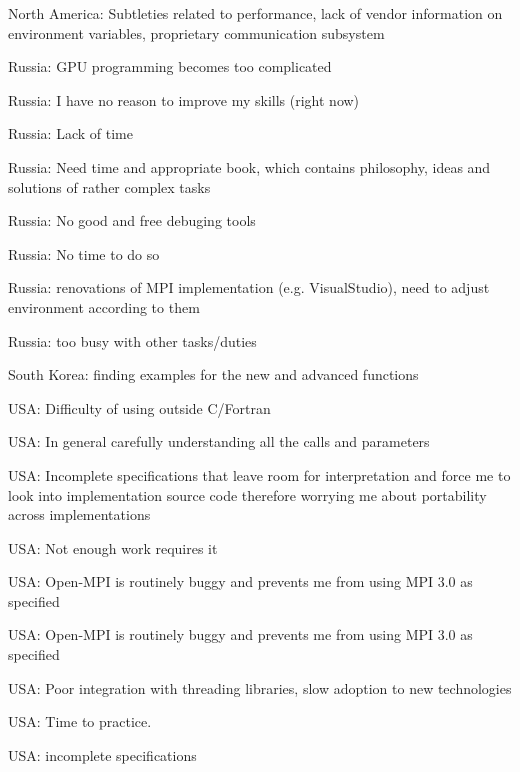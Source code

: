 \item North America: Subtleties related to performance, lack of vendor information on environment variables, proprietary communication subsystem
\item Russia: GPU programming becomes too complicated
\item Russia: I have no reason to improve my skills (right now)
\item Russia: Lack of time
\item Russia: Need time and appropriate book, which contains philosophy, ideas and solutions of rather complex tasks
\item Russia: No good and free debuging tools
\item Russia: No time to do so
\item Russia: renovations of MPI implementation (e.g. VisualStudio), need to adjust environment according to them
\item Russia: too busy with other tasks/duties
\item South Korea: finding examples for the new and advanced functions
\item USA: Difficulty of using outside C/Fortran
\item USA: In general carefully understanding all the calls and parameters
\item USA: Incomplete specifications that leave room for interpretation and force me to look into implementation source code therefore worrying me about portability across implementations
\item USA: Not enough work requires it
\item USA: Open-MPI is routinely buggy and prevents me from using MPI 3.0 as specified
\item USA: Open-MPI is routinely buggy and prevents me from using MPI 3.0 as specified
\item USA: Poor integration with threading libraries, slow adoption to new technologies
\item USA: Time to practice.
\item USA: incomplete specifications
